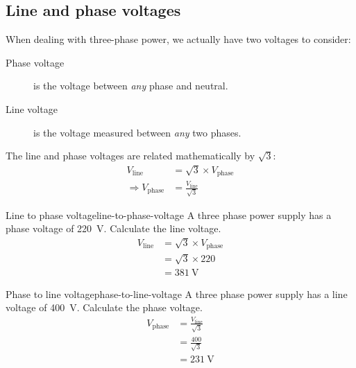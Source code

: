 \subsection{Line and phase voltages}

When dealing with three-phase power, we actually have two voltages to consider:
\begin{description}
\item[Phase voltage] is the voltage between \textit{any} phase and neutral.
\item[Line voltage] is the voltage measured between \textit{any} two phases.
\end{description}

The line and phase voltages are related mathematically by $\sqrt{3}$:
\begin{align}
  V_{\mbox{line}} & = \sqrt{3} \times V_{\mbox{phase}}\\
\Rightarrow  V_{\mbox{phase}} & = \frac{V_{\mbox{line}}}{\sqrt{3}}                     
\end{align}

\begin{example}{Line to phase voltage}{line-to-phase-voltage}
  A three phase power supply has a phase voltage of \SI{220}{\volt}.
  Calculate the line voltage.
  \tcblower
  \begin{align}
    V_{\mbox{line}} & = \sqrt{3} \times V_{\mbox{phase}} \\
                     & = \sqrt{3} \times 220  \\
                     & = \SI{381}{\volt}
  \end{align}
\end{example}

\begin{example}{Phase to line voltage}{phase-to-line-voltage}
  A three phase power supply has a line voltage of \SI{400}{\volt}.
  Calculate the phase voltage.
  \tcblower
  \begin{align}
    V_{\mbox{phase}} & = \frac{V_{\mbox{line}}}{\sqrt{3}} \\
                     & = \frac{400}{\sqrt{3}} \\
                     & = \SI{231}{\volt}
  \end{align}
\end{example}



